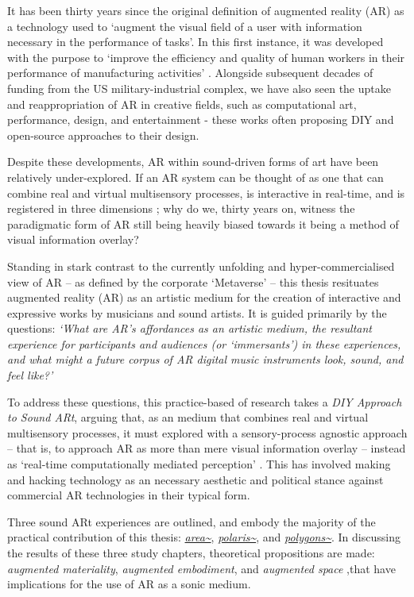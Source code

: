 \begin{SingleSpace}
    It has been thirty years since the original definition of augmented reality (AR) as a technology used to `augment the visual field of a user with information necessary in the performance of tasks'. In this first instance, it was developed with the purpose to `improve the efficiency and quality of human workers in their performance of manufacturing activities' \citep{caudell1992}. Alongside subsequent decades of funding from the US military-industrial complex, we have also seen the uptake and reappropriation of AR in creative fields, such as computational art, performance, design, and entertainment - these works often proposing DIY and open-source approaches to their design. 

    Despite these developments, AR within sound-driven forms of art have been relatively under-explored. If an AR system can be thought of as one that can combine real and virtual multisensory processes, is interactive in real-time, and is registered in three dimensions \citep{azuma1997}; why do we, thirty years on, witness the paradigmatic form of AR still being heavily biased \citep{billinghurst2015} towards it being a method of visual information overlay?
    
    Standing in stark contrast to the currently unfolding and hyper-commercialised view of AR -- as defined by the corporate `Metaverse' -- this thesis resituates augmented reality (AR) as an artistic medium for the creation of interactive and expressive works by musicians and sound artists. It is guided primarily by the questions: \textit{`What are AR's affordances as an artistic medium, the resultant experience for participants and audiences (or `immersants') in these experiences, and what might a future corpus of AR digital music instruments look, sound, and feel like?'}
    
    To address these questions, this practice-based of research takes a \textit{DIY Approach to Sound ARt}, arguing that, as an medium that combines real and virtual multisensory processes, it must explored with a sensory-process agnostic approach -- that is, to approach AR as more than mere visual information overlay -- instead as `real-time computationally mediated perception' \citep{chevalier2020}. This has involved making and hacking technology as an necessary aesthetic and political stance against commercial AR technologies in their typical form.
    
    Three sound ARt experiences are outlined, and embody the majority of the practical contribution of this thesis: \textit{\href{https://github.com/sambilbow/area}{area\textasciitilde{}}}, \textit{\href{https://github.com/sambilbow/polaris}{polaris\textasciitilde{}}}, and \textit{\href{https://github.com/sambilbow/polygons}{polygons\textasciitilde{}}}. In discussing the results of these three study chapters, theoretical propositions are made: \textit{augmented materiality}, \textit{augmented embodiment}, and \textit{augmented space} ,that have implications for the use of AR as a sonic medium.
    

\end{SingleSpace}
